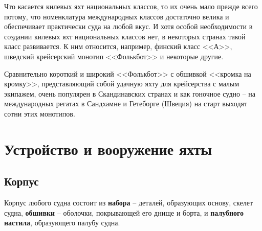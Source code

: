 \documentclass[a4paper, 12pt, twoside, final]{scrbook}
\begin{document}
Что касается килевых яхт национальных классов, то их очень мало прежде
всего потому, что номенклатура международных классов достаточно велика
и обеспечивает практически суда на любой вкус. И хотя особой необходимости
в создании килевых яхт национальных классов нет, в некоторых странах
такой класс развивается. К ним относится, например, финский класс
<<А>>, шведский крейсерский монотип <<Фолькбот>> и некоторые другие.

Сравнительно короткий и широкий <<Фолькбот>> с обшивкой <<кромка на кромку>>,
представляющий собой удачную яхту для крейсерства с малым экипажем,
очень популярен в Скандинавских странах и как гоночное судно \--- на
международных регатах в Сандхамне и Гетеборге (Швеция) на старт выходят
сотни этих монотипов.

%
%

\chapter{Устройство и вооружение яхты}

%
%

\section{Корпус}

Корпус любого судна состоит из \textbf{набора} \--- деталей, образующих
основу, скелет судна, \textbf{обшивки} \--- оболочки, покрывающей его
днище и борта, и \textbf{палубного настила}, образующего палубу судна.
\end{document}
